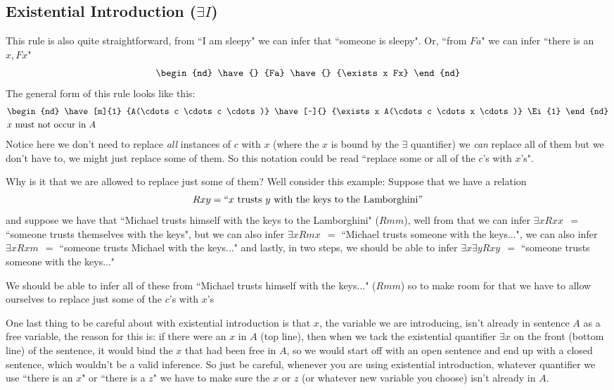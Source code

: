 \subsection{Existential Introduction ($\exists I$)}
This rule is also quite straightforward, from ``I am sleepy" we can infer that ``someone is sleepy". Or, ``from $Fa$" we can infer ``there is an $x, Fx$"
\begin{equation}
    \begin{nd}
        \have{} {Fa}
        \have{} {\exists x Fx}
    \end{nd}\nonumber
\end{equation}
The general form of this rule looks like this:
\begin{align}
    &\begin{nd}
        \have[m]{1} {A(\cdots c \cdots c \cdots)}
        \have[~]{} {\exists x A(\cdots c \cdots x \cdots)} \Ei{1} %
    \end{nd}\nonumber\\
    &x \text{ must not occur in }A \nonumber
\end{align}
Notice here we don't need to replace \textit{all} instances of $c$ with $x$ (where the $x$ is bound by the $\exists$ quantifier) we \textit{can} replace all of them but we don't have to, we might just replace some of them. So this notation could be read ``replace some or all of the $c$'s with $x$'s".

Why is it that we are allowed to replace just some of them? Well consider this example:
Suppose that we have a relation 
\begin{equation}
    Rxy = ``x \text{ trusts } y \text{ with the keys to the Lamborghini}" \nonumber
\end{equation}
 and suppose we have that ``Michael trusts himself with the keys to the Lamborghini" ($Rmm$), well from that we can infer $\exists x Rxx \ \ =$  ``someone trusts themselves with the keys", but we can also infer $\exists x Rmx \ \ =$ ``Michael trusts someone with the keys...", we can also infer $\exists x Rxm \ \ =$ ``someone trusts Michael with the keys..." and lastly, in two steps, we should be able to infer $\exists x \exists y Rxy \ \ =$ ``someone trusts someone with the keys..."

We should be able to infer all of these from ``Michael trusts himself with the keys..." ($Rmm$) so to make room for that we have to allow ourselves to replace just some of the $c$'s with $x$'s

One last thing to be careful about with existential introduction is that $x$, the variable we are introducing, isn't already in sentence $A$ as a free variable, the reason for this is: if there were an $x$ in $A$ (top line), then when we tack the existential quantifier $\exists x$ on the front (bottom line) of the sentence, it would bind the $x$ that had been free in $A$, so we would start off with an open sentence and end up with a closed sentence, which wouldn't be a valid inference. So just be careful, whenever you are using existential introduction, whatever quantifier we use ``there is an $x$" or ``there is a $z$" we have to make sure the $x$ or $z$ (or whatever new variable you choose) isn't already in $A$.

